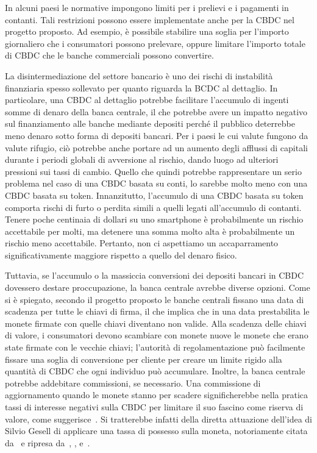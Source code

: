 \documentclass{article}
\begin{document}
In alcuni paesi le normative impongono limiti per i prelievi e i 
pagamenti in contanti. Tali restrizioni possono essere implementate 
anche per la CBDC nel progetto proposto. Ad esempio, è possibile 
stabilire una soglia per l'importo giornaliero che i consumatori possono 
prelevare, oppure limitare l'importo totale di CBDC che le banche 
commerciali possono convertire.

La disintermediazione del settore bancario è uno dei rischi di 
instabilità finanziaria spesso sollevato per quanto riguarda la BCDC 
al dettaglio. In particolare, una CBDC al dettaglio potrebbe 
facilitare l'accumulo di ingenti somme di denaro della banca 
centrale, il che potrebbe avere un impatto negativo sul finanziamento 
alle banche mediante depositi perché il pubblico deterrebbe meno 
denaro sotto forma di depositi bancari. Per i paesi le cui valute 
fungono da valute rifugio, ciò potrebbe anche portare ad un aumento 
degli afflussi di capitali durante i periodi globali di avversione al 
rischio, dando luogo ad ulteriori pressioni sui tassi di cambio. 
Quello che quindi potrebbe rappresentare un serio problema nel caso di 
una CBDC basata su conti, lo sarebbe molto meno con una CBDC basata 
su token. Innanzitutto, l'accumulo di una CBDC basata su token comporta 
rischi di furto o perdita simili a quelli legati all'accumulo di 
contanti. Tenere poche centinaia di dollari su uno smartphone è 
probabilmente un rischio accettabile per molti, ma detenere una somma 
molto alta è probabilmente un rischio meno accettabile. Pertanto, non 
ci aspettiamo un accaparramento significativamente maggiore rispetto a 
quello del denaro fisico.

Tuttavia, se l'accumulo o la massiccia conversioni dei depositi 
bancari in CBDC dovessero destare proccupazione, la banca centrale 
avrebbe diverse opzioni. Come si è spiegato, secondo il progetto 
proposto le banche centrali fissano una data di scadenza per tutte le 
chiavi di firma, il che implica che in una data prestabilita le monete 
firmate con quelle chiavi diventano non valide. Alla scadenza delle 
chiavi di valore, i consumatori devono scambiare con monete nuove le 
monete che erano state firmate con le vecchie chiavi; l'autorità di 
regolamentazione può facilmente fissare una soglia di conversione per 
cliente per creare un limite rigido alla quantità di CBDC che ogni 
individuo può accumulare. Inoltre, la banca centrale potrebbe addebitare 
commissioni, se necessario. Una commissione di aggiornamento quando le monete 
stanno per scadere significherebbe nella pratica tassi di interesse negativi 
sulla CBDC per limitare il suo fascino come riserva di valore, come 
suggerisce~\cite{Bindseil}. Si tratterebbe infatti della diretta attuazione 
dell'idea di Silvio Gesell di applicare una tassa di possesso sulla moneta, 
notoriamente citata da~\cite{Keynes} e ripresa da~\cite{Goodfriend}, 
\cite{Buiter}, e~\cite{Agarwal}.
\end{document}
